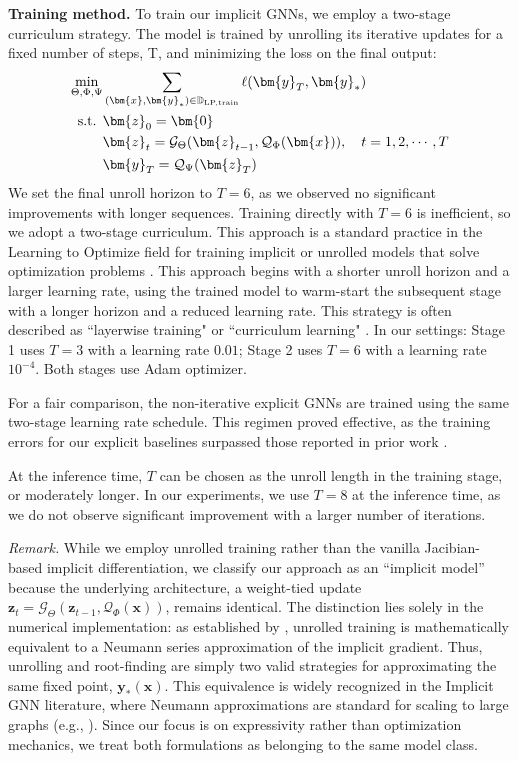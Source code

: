 \documentclass{amsart} %
\def\vzero{{\bm{0}}}
\def\vx{{\bm{x}}}
\def\vy{{\bm{y}}}
\def\vz{{\bm{z}}}
\def\sD{{\mathbb{D}}}
\def\cG{{\mathcal{G}}}
\def\cQ{{\mathcal{Q}}}
\theoremstyle{definition}
\theoremstyle{remark}
\begin{document}
\textbf{Training method.} To train our implicit GNNs, we employ a two-stage curriculum strategy. The model is trained by unrolling its iterative updates for a fixed number of steps, T, and minimizing the loss on the final output:
\begin{align*}
\min_{\Theta,\Phi,\Psi} & \sum_{(\vx,\vy_\ast) \in \sD_{\textup{LP,train}}} \ell(\vy_T, \vy_\ast) \\
\textup{s.t. } & \vz_0 = \vzero \\
& \vz_{t} = \cG_\Theta(\vz_{t-1},\cQ_{\Phi}(\vx)), \quad t=1,2,\cdots,T \\
& \vy_T = \cQ_\Psi(\vz_T)
\end{align*}
We set the final unroll horizon to $T=6$, as we observed no significant improvements with longer sequences. Training directly with $T=6$ is inefficient, so we adopt a two-stage curriculum. This approach is a standard practice in the Learning to Optimize field for training implicit or unrolled models that solve optimization problems \cite{chen2022learning}. This approach begins with a shorter unroll horizon and a larger learning rate, using the trained model to warm-start the subsequent stage with a longer horizon and a reduced learning rate. This strategy is often described as ``layerwise training" \cite{chen2018theoretical,liu2019alista} or ``curriculum learning" \cite{chen2020training,liu2023towards,he2024mathematics}. In our settings: Stage 1 uses $T=3$ with a learning rate $0.01$; Stage 2 uses $T=6$ with a learning rate $10^{-4}$. Both stages use Adam optimizer.

For a fair comparison, the non-iterative explicit GNNs are trained using the same two-stage learning rate schedule. This regimen proved effective, as the training errors for our explicit baselines surpassed those reported in prior work \cite{chen2023lp}.

At the inference time, $T$ can be chosen as the unroll length in the training stage, or moderately longer. In our experiments, we use $T=8$ at the inference time, as we do not observe significant improvement with a larger number of iterations.

\textit{Remark.} While we employ unrolled training rather than the vanilla Jacibian-based implicit differentiation, we classify our approach as an “implicit model” because the underlying architecture, a weight-tied update $\vz_{t} = \cG_\Theta(\vz_{t-1},\cQ_{\Phi}(\vx))$, remains identical. The distinction lies solely in the numerical implementation: as established by \cite{geng2021training}, unrolled training is mathematically equivalent to a Neumann series approximation of the implicit gradient. Thus, unrolling and root-finding are simply two valid strategies for approximating the same fixed point, $\vy_\ast(\vx)$. This equivalence is widely recognized in the Implicit GNN literature, where Neumann approximations are standard for scaling to large graphs (e.g., \cite{baker2023implicit}). Since our focus is on expressivity rather than optimization mechanics, we treat both formulations as belonging to the same model class.
\end{document}
